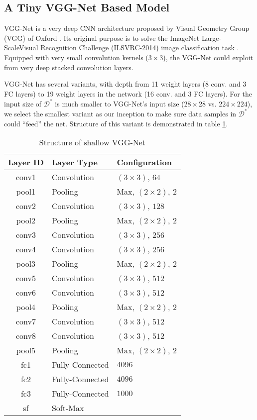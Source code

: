 \subsection{A Tiny VGG-Net Based Model}
VGG-Net is a very deep CNN architecture proposed by Visual Geometry Group (VGG) of Oxford \cite{simonyan2014very}.
Its original purpose is to solve the ImageNet Large-ScaleVisual Recognition Challenge
(ILSVRC-2014) image classification task \cite{russakovsky2015imagenet}.
Equipped with very small convolution kernels ($3 \times 3$), the VGG-Net could exploit from very deep
stacked convolution layers.

VGG-Net has several variants, with depth from 11 weight layers (8 conv. and 3 FC layers) 
to 19 weight layers in the network (16 conv. and 3 FC layers). For the input size of $\mathcal{D}^*$
is much smaller to VGG-Net's input size ($28 \times 28$ vs. $224 \times 224$),
we select the smallest variant as our inception to make sure data samples in $\mathcal{D}^*$ could ``feed'' the net.
Structure of this variant is demonstrated in table \ref{tab::VGG-Net}.

\begin{table}[htb]
    \centering
    \begin{tabular}{cll}
        \toprule
        Layer ID & Layer Type & Configuration \\
        \midrule
        conv1 & Convolution & $\left(3\times3\right)$, $64$ \\
        pool1 & Pooling       & Max, $\left(2\times2\right)$, $2$ \\
        conv2 & Convolution & $\left(3\times3\right)$, $128$ \\
        pool2 & Pooling       & Max, $\left(2\times2\right)$, $2$ \\
        conv3 & Convolution & $\left(3\times3\right)$, $256$ \\
        conv4 & Convolution & $\left(3\times3\right)$, $256$ \\
        pool3 & Pooling       & Max, $\left(2\times2\right)$, $2$ \\
        conv5 & Convolution & $\left(3\times3\right)$, $512$ \\
        conv6 & Convolution & $\left(3\times3\right)$, $512$ \\
        pool4 & Pooling       & Max, $\left(2\times2\right)$, $2$ \\
        conv7 & Convolution & $\left(3\times3\right)$, $512$ \\
        conv8 & Convolution & $\left(3\times3\right)$, $512$ \\
        pool5 & Pooling       & Max, $\left(2\times2\right)$, $2$ \\
        fc1   & Fully-Connected & $4096$ \\
        fc2   & Fully-Connected & $4096$ \\
        fc3   & Fully-Connected & $1000$ \\
        sf    & Soft-Max      & \\
        \bottomrule
    \end{tabular}
    \caption{Structure of shallow VGG-Net}
    \label{tab::VGG-Net}
\end{table}

